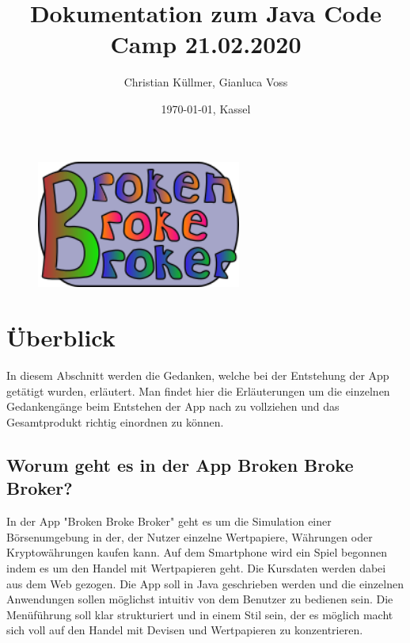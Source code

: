 \documentclass[10pt]{scrartcl}
\begin{document}
\title{Dokumentation zum Java Code Camp 21.02.2020}

\author{Christian Küllmer, Gianluca Voss}
\date{\today{}, Kassel}
\maketitle
\begin{figure}[H]
	\centering
	\includegraphics[width=0.6\textwidth]{Bilder/Titelblatt/big_logo.png}
\end{figure}
\newpage
\renewcommand{\contentsname}{Inhaltsverzeichnis}
\tableofcontents
\newpage

\section{Überblick}

In diesem Abschnitt werden die Gedanken, welche bei der Entstehung der App getätigt wurden, erläutert. Man findet hier die Erläuterungen um die einzelnen Gedankengänge beim Entstehen der App nach zu vollziehen und das Gesamtprodukt richtig einordnen zu können.

\subsection{Worum geht es in der App Broken Broke Broker?}
In der App "Broken Broke Broker" geht es um die Simulation einer Börsenumgebung in der, der Nutzer einzelne Wertpapiere, Währungen oder Kryptowährungen kaufen kann. Auf dem Smartphone wird ein Spiel begonnen indem es um den Handel mit Wertpapieren geht. Die Kursdaten werden dabei aus dem Web gezogen. Die App soll in Java geschrieben werden und die einzelnen Anwendungen sollen möglichst intuitiv von dem Benutzer zu bedienen sein. Die Menüführung soll klar strukturiert und in einem Stil sein, der es möglich macht sich voll auf den Handel mit Devisen und Wertpapieren zu konzentrieren.
\end{document}
